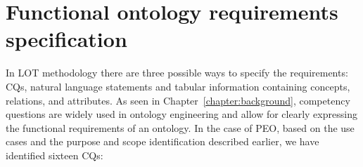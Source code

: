 \section{Functional ontology requirements specification}
In LOT methodology there are three possible ways to specify the requirements: CQs, natural language statements and tabular information containing concepts, relations, and attributes.
As seen in Chapter~\ref{chapter:background}, competency questions are widely used in ontology engineering and allow for clearly expressing the functional requirements of an ontology.
In the case of PEO, based on the use cases and the purpose and scope identification described earlier, we have identified sixteen CQs:

